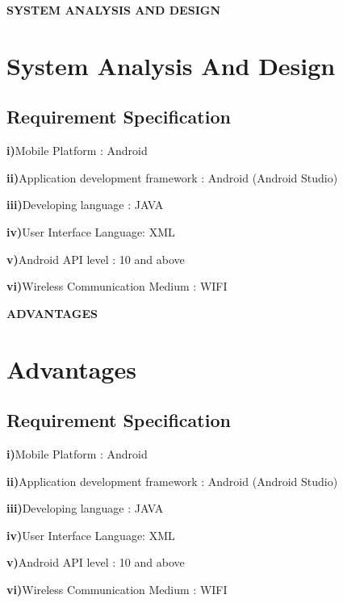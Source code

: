\documentclass[12pt]{article}
\begin{document}
\begin{center}

\Large \textbf{SYSTEM ANALYSIS AND DESIGN}\\[10mm]
 \end{center}

 \section{System Analysis And Design}

 \subsection{Requirement Specification }\par
 \hspace{6.5mm}\textbf{i)}Mobile Platform : Android \par
\textbf{ii)}Application development framework : Android (Android Studio) \par
\textbf{iii)}Developing language : JAVA \par
\textbf{iv)}User Interface Language: XML\par
\textbf{v)}Android API level : 10 and above\par
\textbf{vi)}Wireless Communication Medium : WIFI\par 



\clearpage



\begin{center}

\Large \textbf{ADVANTAGES}\\[10mm]
 \end{center}

 \section{Advantages}

 \subsection{Requirement Specification }\par
 \hspace{6.5mm}\textbf{i)}Mobile Platform : Android \par
\textbf{ii)}Application development framework : Android (Android Studio) \par
\textbf{iii)}Developing language : JAVA \par
\textbf{iv)}User Interface Language: XML\par
\textbf{v)}Android API level : 10 and above\par
\textbf{vi)}Wireless Communication Medium : WIFI\par 
\end{document}
